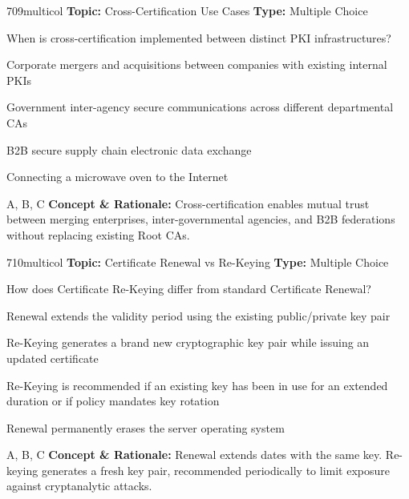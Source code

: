 \begin{qcard}{709}{multicol}
\textcolor{darkslate!75}{\small\textbf{Topic:} Cross-Certification Use Cases \hfill \textbf{Type:} Multiple Choice}\vspace{0.4em}\par
When is cross-certification implemented between distinct PKI infrastructures?
\begin{qoptions}
\item Corporate mergers and acquisitions between companies with existing internal PKIs
\item Government inter-agency secure communications across different departmental CAs
\item B2B secure supply chain electronic data exchange
\item Connecting a microwave oven to the Internet
\end{qoptions}
\end{qcard}
\nopagebreak
\begin{explainbox}{A, B, C}
\textbf{Concept \& Rationale:} Cross-certification enables mutual trust between merging enterprises, inter-governmental agencies, and B2B federations without replacing existing Root CAs.
\end{explainbox}

\begin{qcard}{710}{multicol}
\textcolor{darkslate!75}{\small\textbf{Topic:} Certificate Renewal vs Re-Keying \hfill \textbf{Type:} Multiple Choice}\vspace{0.4em}\par
How does Certificate Re-Keying differ from standard Certificate Renewal?
\begin{qoptions}
\item Renewal extends the validity period using the existing public/private key pair
\item Re-Keying generates a brand new cryptographic key pair while issuing an updated certificate
\item Re-Keying is recommended if an existing key has been in use for an extended duration or if policy mandates key rotation
\item Renewal permanently erases the server operating system
\end{qoptions}
\end{qcard}
\nopagebreak
\begin{explainbox}{A, B, C}
\textbf{Concept \& Rationale:} Renewal extends dates with the same key. Re-keying generates a fresh key pair, recommended periodically to limit exposure against cryptanalytic attacks.
\end{explainbox}

